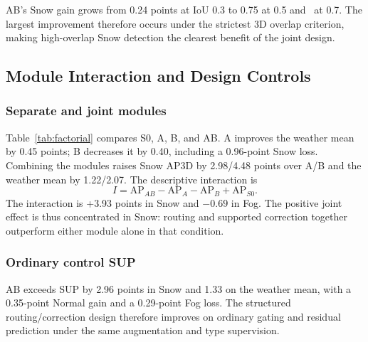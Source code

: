 \begin{table}[t]
\caption{Test Vehicle AP3D at IoU 0.7 (\%; Higher Is Better). $M_{\mathrm{weather}}$ Is Defined in~\eqref{eq:weather}; $\Delta M$ Is Its Change from S0 in Percentage Points. Bold Indicates Column Maxima.}
\label{tab:main}
\centering

\end{table}

AB's Snow gain grows from 0.24 points at IoU 0.3 to 0.75 at 0.5 and \ABSnowGain\ at 0.7. The largest improvement therefore occurs under the strictest 3D overlap criterion, making high-overlap Snow detection the clearest benefit of the joint design.

\subsection{Module Interaction and Design Controls}
\subsubsection{Separate and joint modules}
Table~\ref{tab:factorial} compares S0, A, B, and AB. A improves the weather mean by 0.45 points; B decreases it by 0.40, including a 0.96-point Snow loss. Combining the modules raises Snow AP3D by 2.98/4.48 points over A/B and the weather mean by 1.22/2.07. The descriptive interaction is
\begin{equation}
I=\mathrm{AP}_{AB}-\mathrm{AP}_{A}-\mathrm{AP}_{B}+\mathrm{AP}_{S0}. \label{eq:interaction}
\end{equation}
The interaction is +3.93 points in Snow and $-0.69$ in Fog. The positive joint effect is thus concentrated in Snow: routing and supported correction together outperform either module alone in that condition.

\begin{table}[t]
\caption{Derived Four-Cell Effects at IoU 0.7 (Percentage Points). $I$ Is Defined in~\eqref{eq:interaction}; Values Are Derived from the Runs in Table~\ref{tab:main}.}
\label{tab:factorial}
\centering

\end{table}

\subsubsection{Ordinary control SUP}
AB exceeds SUP by 2.96 points in Snow and 1.33 on the weather mean, with a 0.35-point Normal gain and a 0.29-point Fog loss. The structured routing/correction design therefore improves on ordinary gating and residual prediction under the same augmentation and type supervision.

